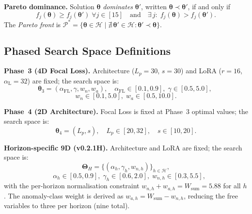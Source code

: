 ﻿\documentclass[twocolumn]{article}
\begin{document}
\textbf{Pareto dominance.}
Solution $\boldsymbol{\theta}$ \emph{dominates} $\boldsymbol{\theta}'$,
written $\boldsymbol{\theta}\prec\boldsymbol{\theta}'$, if and only if
\begin{equation}
  f_j(\boldsymbol{\theta}) \geq f_j(\boldsymbol{\theta}')
  \;\forall j\in[15]
  \quad\text{and}\quad
  \exists\, j:\; f_j(\boldsymbol{\theta}) > f_j(\boldsymbol{\theta}').
  \label{eq:dominance}
\end{equation}
The \emph{Pareto front} is
$\mathcal{P}^* = \{\boldsymbol{\theta}\in\mathcal{H}
  \mid \nexists\,\boldsymbol{\theta}'\in\mathcal{H}:
  \boldsymbol{\theta}'\prec\boldsymbol{\theta}\}$.

\subsection{Phased Search Space Definitions}

\textbf{Phase~3 (4D Focal Loss).}
Architecture ($L_p{=}30$, $s{=}30$) and LoRA ($r{=}16$,
$\alpha_\text{L}{=}32$) are fixed; the search space is:
\begin{equation*}
  \boldsymbol{\theta}_3 =
  (\alpha_\text{FL},\gamma,w_n,w_a),\quad
  \alpha_\text{FL} \in [0.1,0.9],\;
  \gamma \in [0.5,5.0],\;
\end{equation*}
\begin{equation*}
  w_n \in [0.1,5.0],\;
  w_a \in [0.5,10.0].
\end{equation*}

\textbf{Phase~4 (2D Architecture).}
Focal Loss is fixed at Phase~3 optimal values; the search space is:
\begin{equation*}
  \boldsymbol{\theta}_4 = (L_p,s),\quad
  L_p \in [20,32],\quad s \in [10,20].
\end{equation*}

\textbf{Horizon-specific 9D (v0.2.1H).}
Architecture and LoRA are fixed; the search space is:
\begin{equation}
  \boldsymbol{\Theta}_H = \{(\alpha_h,\gamma_h,w_{n,h})\}_{h\in\mathcal{H}},
\end{equation}
\begin{equation}
  \quad
  \alpha_h\in[0.5,0.9],\;
  \gamma_h\in[0.6,2.0],\;
  w_{n,h}\in[0.3,5.5],
  \label{eq:9d_space}
\end{equation}
with the per-horizon normalisation constraint
$w_{n,h}+w_{a,h}=W_\mathrm{sum}=5.88$ for all $h$.
The anomaly-class weight is derived as
$w_{a,h}=W_\mathrm{sum}-w_{n,h}$, reducing the free variables to
three per horizon (nine total).
\end{document}
